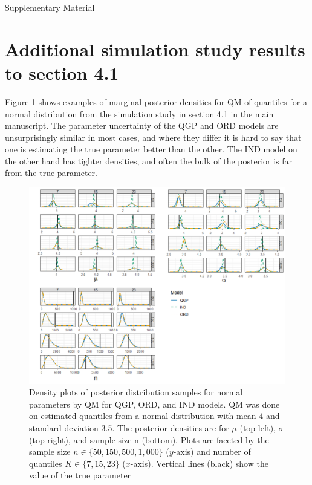 \documentclass[preprint,12pt,authoryear]{elsarticle}
\begin{document}
% 



\begin{center}
  Supplementary Material
\end{center}
\normalsize
 

\section*{Additional simulation study results to section 4.1}
Figure
\ref{fig:norm_dens} shows examples of marginal
posterior densities for QM of quantiles for a normal distribution from the
simulation study in section 4.1 in
the main manuscript. The parameter uncertainty of the QGP and ORD models are
unsurprisingly similar in
most cases, and where they differ it is hard to say that one is estimating the
true parameter better than the
other. The IND model on the other hand has tighter densities, and often the
bulk of the posterior is far from
the true parameter.


\begin{figure}[hbt!]
\centering
  \includegraphics[width = 1\linewidth]{Images/norm_params_fit.png}
\caption{Density plots of posterior distribution samples for normal parameters 
by QM for QGP, ORD, and
IND models. QM was done on estimated quantiles from a normal distribution with 
mean 4 and standard
deviation 3.5. The posterior densities are for $\mu$ (top left), 
$\sigma$ (top right), and 
sample size n (bottom). Plots are
faceted by the sample size $n \in \{50, 150, 500, 1,000\}$ 
($y$-axis) and number of 
quantiles $K \in \{7, 15, 23\}$ ($x$-axis).
Vertical lines (black) show the value of the true parameter}
\label{fig:norm_dens}
\end{figure}
\end{document}
